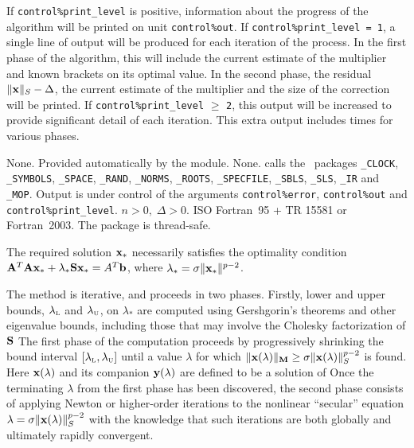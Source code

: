 \documentclass{galahad}
\newcommand{\packagename}{LLSR}
\begin{document}

\galinfo
If {\tt control\%print\_level} is positive, information about the progress
of the algorithm will be printed on unit {\tt control\-\%\-out}.
If {\tt control\%print\_level = 1}, a single line of output will be produced
for each iteration of the process. In the first phase of the algorithm,
this will include the current estimate of the multiplier and known
brackets on its optimal value. In the second phase, the residual
$\|{\mathbf{x}}\|_S - \Delta$, the current estimate of the multiplier and
the size of the correction will be printed.
If {\tt control\%print\_level} $\geq$ {\tt 2}, this
output will be increased to provide significant detail of each iteration.
This extra output includes times for various phases.


\galgeneral

\galcommon None.
\galworkspace Provided automatically by the module.
\galroutines None.
\galmodules {\tt \packagename\_solve} calls the \galahad\ packages
{\tt \libraryname\_CLOCK},
{\tt \libraryname\_SY\-M\-BOLS},
{\tt \libraryname\_\-SPACE},
{\tt \libraryname\-\_\-RAND},
{\tt \libraryname\_\-NORMS},
{\tt \libraryname\_\-ROOTS},
{\tt \libraryname\_SPECFILE},
{\tt \libraryname\_SBLS},
{\tt \libraryname\_SLS},
{\tt \libraryname\_IR}
and
{\tt \libraryname\_MOP}.
\galio Output is under control of the arguments
{\tt control\%error}, {\tt control\%out} and {\tt control\%print\_level}.
\galrestrictions $n  >  0, \;  \Delta  >  0$.
\galportability ISO Fortran~95 + TR 15581 or Fortran~2003.
The package is thread-safe.


\galmethod
The required solution ${\mathbf{x}}_*$ necessarily satisfies the optimality condition
${\mathbf{A}}^T {\mathbf{A}} {\mathbf{x}}_* + \lambda_* {\mathbf{S}} {\mathbf{x}}_* = A^T {\mathbf{b}}$,
where $\lambda_* = \sigma \|{\mathbf{x}}_*\|^{p-2}$.

\noindent
The method is iterative, and proceeds in two phases.
Firstly, lower and upper bounds, $\lambda_{\mbox{\protect\tiny L}}$ and
$\lambda_{\mbox{\protect\tiny U}}$, on $\lambda_*$ are computed
using Gershgorin's theorems and other eigenvalue bounds,
including those that may involve the Cholesky factorization of ${\mathbf{S}}$  The
first phase of the computation proceeds by progressively shrinking  the bound
interval $[\lambda_{\mbox{\protect\tiny L}},\lambda_{\mbox{\protect\tiny U}}]$
until a value $\lambda$ for which
$\|{\mathbf{x}}(\lambda)\|_{{\mathbf{M}}}  \geq  \sigma \|{\mathbf{x}}(\lambda)\|_S^{p-2}$ is found.
Here ${\mathbf{x}}(\lambda)$ and its companion ${\mathbf{y}}(\lambda)$
are defined to be a solution of
Once the terminating $\lambda$ from the first phase has been discovered,
the second phase
consists of applying Newton or higher-order iterations to the nonlinear
``secular'' equation $\lambda = \sigma \|{\mathbf{x}}(\lambda)\|_S^{p-2}$ with
the knowledge that such iterations are both globally and ultimately
rapidly convergent.
\end{document}

